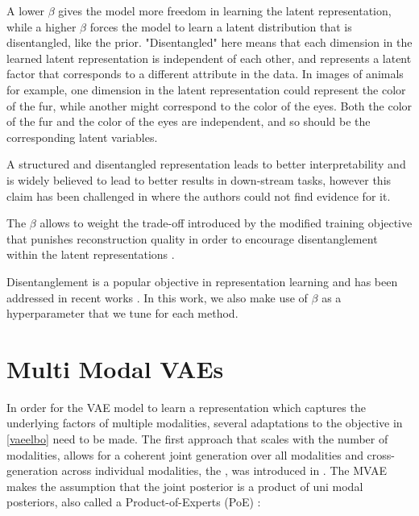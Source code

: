 A lower $\beta$ gives the model more freedom in learning the latent representation, while a higher $\beta$ forces the model to learn a latent distribution that is disentangled, like the prior.
"Disentangled" here means that each dimension in the learned latent representation is independent of each other, and represents a latent factor that corresponds to a different attribute in the data.
In images of animals for example, one dimension in the latent representation could represent the color of the fur, while another might correspond to the color of the eyes.
Both the color of the fur and the color of the eyes are independent, and so should be the corresponding latent variables.

A structured and disentangled representation leads to better interpretability and is widely believed to lead to better results in down-stream tasks, however this claim has been challenged in \cite{locatello_challenging_2019} where the authors could not find evidence for it.

The $\beta$ allows to weight the trade-off introduced by the modified training objective that punishes reconstruction quality in order to encourage disentanglement within the latent representations \citep{burgess_understanding_2018}.



Disentanglement is a popular objective in representation learning and has been addressed in recent works \parencite{chen_isolating_2019, locatello_challenging_2019}.
In this work, we also make use of $\beta$ as a hyperparameter that we tune for each method.


\section{Multi Modal VAEs}
\label{subsec:Multi Modal VAEs}
In order for the VAE model to learn a representation which captures the underlying factors of multiple modalities, several adaptations to the objective in \cref{vaeelbo} need to be made.
The first approach that scales with the number of modalities, allows for a coherent joint generation over all modalities and cross-generation across individual modalities, the , was introduced in \cite{poe}.
The MVAE makes the assumption that the joint posterior is a product of uni modal posteriors, also called a Product-of-Experts (PoE) \parencite{hinton_training_2002}:

